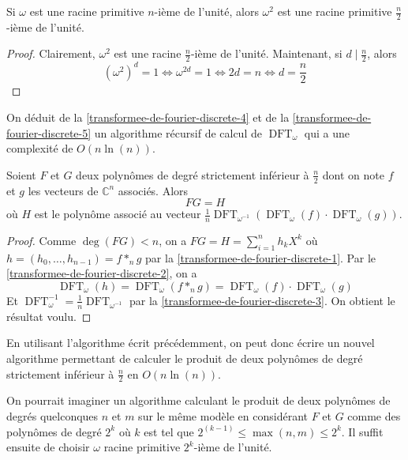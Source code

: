 	\begin{proposition}
		\label{transformee-de-fourier-discrete-5}
		Si $\omega$ est une racine primitive $n$-ième de l'unité, alors $\omega^2$ est une racine primitive $\frac{n}{2}$-ième de l'unité.
	\end{proposition}
	
	\begin{proof}
		Clairement, $\omega^2$ est une racine $\frac{n}{2}$-ième de l'unité. Maintenant, si $d \mid \frac{n}{2}$, alors
		\[ (\omega^2)^d = 1 \iff \omega^{2d} = 1 \iff 2d = n \iff d = \frac{n}{2} \]
	\end{proof}
	
	On déduit de la \cref{transformee-de-fourier-discrete-4} et de la \cref{transformee-de-fourier-discrete-5} un algorithme récursif de calcul de $\operatorname{DFT}_\omega$ qui a une complexité de $O(n \ln(n))$.
	

	\begin{theorem}
		Soient $F$ et $G$ deux polynômes de degré strictement inférieur à $\frac{n}{2}$ dont on note $f$ et $g$ les vecteurs de $\mathbb{C}^n$ associés. Alors
		\[ FG = H \]
		où $H$ est le polynôme associé au vecteur $\frac{1}{n} \operatorname{DFT}_{\omega^{-1}} (\operatorname{DFT}_\omega(f) \cdot \operatorname{DFT}_\omega(g))$.
	\end{theorem}
	
	\begin{proof}
		Comme $\deg(FG) < n$, on a $FG = H = \sum_{i=1}^n h_k X^k$ où $h = (h_0, \dots, h_{n-1}) = f *_n g$ par la \cref{transformee-de-fourier-discrete-1}. Par le \cref{transformee-de-fourier-discrete-2}, on a
		\[ \operatorname{DFT}_\omega (h) = \operatorname{DFT}_\omega(f *_n g) = \operatorname{DFT}_\omega(f) \cdot \operatorname{DFT}_\omega(g) \]
		Et $\operatorname{DFT}_\omega^{-1} = \frac{1}{n} \operatorname{DFT}_{\omega^{-1}}$ par la \cref{transformee-de-fourier-discrete-3}. On obtient le résultat voulu.
	\end{proof}
	
	En utilisant l'algorithme écrit précédemment, on peut donc écrire un nouvel algorithme permettant de calculer le produit de deux polynômes de degré strictement inférieur à $\frac{n}{2}$ en $O(n \ln(n))$.


	\begin{remark}
		On pourrait imaginer un algorithme calculant le produit de deux polynômes de degrés quelconques $n$ et $m$ sur le même modèle en considérant $F$ et $G$ comme des polynômes de degré $2^k$ où $k$ est tel que $2^{(k-1)} \leq
		\max(n, m) \leq 2^k$. Il suffit ensuite de choisir $\omega$ racine primitive $2^k$-ième de l'unité.
	\end{remark}

